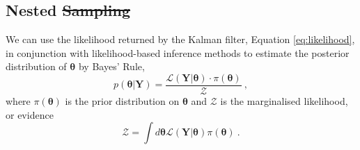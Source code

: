\documentclass[fleqn,usenatbib,useAMS]{mnras}
\providecommand{\DIFadd}[1]{{\protect\color{blue}\uwave{#1}}} %
\providecommand{\DIFdel}[1]{{\protect\color{red}\sout{#1}}}                      %
\providecommand{\DIFaddbegin}{} %
\providecommand{\DIFaddend}{} %
\providecommand{\DIFdelbegin}{} %
\providecommand{\DIFdelend}{} %
\newcommand{\DIFscaledelfig}{0.5}
\newlength{\DIFdelgraphicswidth} %
\newlength{\DIFdelgraphicsheight} %
\newcommand{\DIFaddincludegraphics}[2][]{{\color{blue}\fbox{\DIFOincludegraphics[#1]{#2}}}} %
\newcommand{\DIFdelincludegraphics}[2][]{%
\sbox{\DIFdelgraphicsbox}{\DIFOincludegraphics[#1]{#2}}%
\settoboxwidth{\DIFdelgraphicswidth}{\DIFdelgraphicsbox} %
\settoboxtotalheight{\DIFdelgraphicsheight}{\DIFdelgraphicsbox} %
\scalebox{\DIFscaledelfig}{%
\parbox[b]{\DIFdelgraphicswidth}{\usebox{\DIFdelgraphicsbox}\\[-\baselineskip] \rule{\DIFdelgraphicswidth}{0em}}\llap{\resizebox{\DIFdelgraphicswidth}{\DIFdelgraphicsheight}{%
\setlength{\unitlength}{\DIFdelgraphicswidth}%
\begin{picture}(1,1)%
\thicklines\linethickness{2pt} %
{\color[rgb]{1,0,0}\put(0,0){\framebox(1,1){}}}%
{\color[rgb]{1,0,0}\put(0,0){\line( 1,1){1}}}%
{\color[rgb]{1,0,0}\put(0,1){\line(1,-1){1}}}%
\end{picture}%
}\hspace*{3pt}}} %
} %
\DeclareRobustCommand{\DIFaddbegin}{\DIFOaddbegin \let\includegraphics\DIFaddincludegraphics} %
\DeclareRobustCommand{\DIFaddend}{\DIFOaddend \let\includegraphics\DIFOincludegraphics} %
\DeclareRobustCommand{\DIFdelbegin}{\DIFOdelbegin \let\includegraphics\DIFdelincludegraphics} %
\DeclareRobustCommand{\DIFdelend}{\DIFOaddend \let\includegraphics\DIFOincludegraphics} %
\begin{document}
\DIFaddend \subsection{Nested \DIFdelbegin \DIFdel{Sampling}\DIFdelend \DIFaddbegin \DIFadd{sampling}\DIFaddend }\label{sec:nested_sampling}
We can use the likelihood returned by the Kalman filter, Equation \eqref{eq:likelihood}, in conjunction with likelihood-based inference methods to estimate the posterior distribution of $\boldsymbol{\theta}$ by Bayes' Rule,
\begin{equation}
	p(\boldsymbol{\theta} | \boldsymbol{Y}) = \frac{\mathcal{L}(\boldsymbol{Y} | \boldsymbol{\theta}) \cdot \pi(\boldsymbol{\theta})}{\mathcal{Z}} \ ,
\end{equation}
where $\pi(\boldsymbol{\theta})$ is the prior distribution on $\boldsymbol{\theta}$ and $\mathcal{Z}$ is the marginalised likelihood, or evidence
\begin{equation}
	\mathcal{Z} = \int d \boldsymbol{\theta} \mathcal{L}(\boldsymbol{Y} | \boldsymbol{\theta})  \pi(\boldsymbol{\theta})  \ . \label{eq:model_evidence}
\end{equation}
\end{document}
